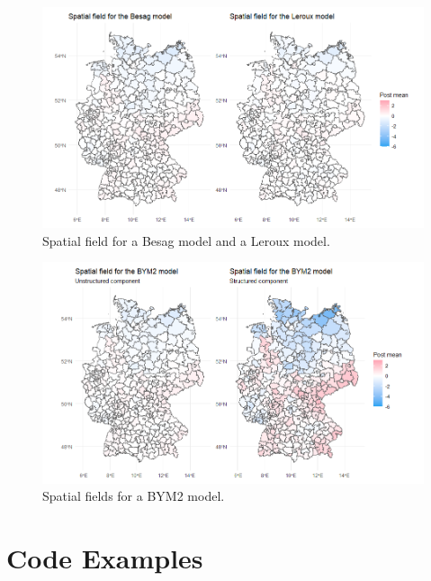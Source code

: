 \begin{figure}[H]
    \centering
    \includegraphics[width = \textwidth]{spatial_field_germany_1.png}
    \caption{Spatial field for a Besag model and a Leroux model.}
    \label{comparison_germany_6}
\end{figure}
\begin{figure}[H]
    \centering
    \includegraphics[width = \textwidth]{spatial_field_germany_2.png}
    \caption{Spatial fields for a BYM2 model.}
    \label{comparison_germany_7}
\end{figure}
\clearpage
\section{Code Examples}
